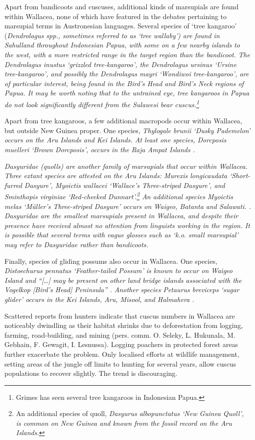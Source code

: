 Apart from bandicoots and cuscuses, additional kinds of marsupials
are found within Wallacea,
none of which have featured in the debates pertaining to marsupial
terms in Austronesian languages.
Several species of ‘tree kangaroo’ (\it{Dendrolagus spp}.,
sometimes referred to as ‘tree wallaby’) are found in Sahulland
throughout Indonesian Papua, with some on a few nearby islands to the west,
with a more restricted range in the target region than the bandicoot.
The \it{Dendrolagus inustus} ‘grizzled tree-kangaroo’,
the \it{Dendrolagus ursinus} ‘Ursine tree-kangaroo’,
and possibly the \it{Dendrolagus mayri} ‘Wondiwoi tree-kangaroo’,
are of particular interest,
being found in the Bird’s Head
and Bird’s Neck regions of Papua.
It may be worth noting that to the untrained eye,
tree kangaroos in Papua do not look significantly different from
the Sulawesi bear cuscus.\footnote{
		Grimes has seen several tree
		kangaroos in Indonesian Papua.}

Apart from tree kangaroos,
a few additional macropods occur within Wallacea, but outside New Guinea proper.
One species, \it{Thylogale brunii} ‘Dusky Pademelon’ occurs on
the Aru Islands and Kei Islands.
At least one species,
\it{Dorcposis muelleri} ‘Brown Dorcposis’,
occurs in the Raja Ampat Islands
\citep[60f, 64f]{LaveryFlannery2023}.

\it{Dasyuridae} (quolls) are another family of marsupials that occur within Wallacea.
Three extant species are attested on the Aru Islands: \it{Murexis
longicaudata} ‘Short-furred Dasyure’, \it{Myoictis wallacei} ‘Wallace’s Three-striped Dasyure’,
and \it{Sminthopis virginiae} ‘Red-cheeked Dunnart’.\footnote{
		An
		additional species of quoll,
		\it{Dasyurus albopunctatus} ‘New Guinea Quoll’,
		is common on New Guinea
		and known from the fossil record on the Aru Islands.}
An additional
species \it{Myoictis melas} ‘Müller’s Three-striped Dasyure’
occurs on Waigeo, Batanta and Salawati. \citep[42--48]{LaveryFlannery2023}.
\it{Dasyuridae} are the smallest marsupials present in Wallacea,
and despite their presence have received almost no attention
from linguists working in the region.
It is possible that several terms with vague glosses such as ‘k.o.
small marsupial’ may refer to \it{Dasyuridae} rather than bandicoots.

Finally, species of gliding possums also occur in Wallacea.
One species, \it{Distoechurus pennatus} ‘Feather-tailed Possum’
is known to occur on Waigeo Island
and “[{\ldots}] may be present on other land bridge islands associated
with the Vogelkop [Bird’s Head] Peninsula” \citep[56]{LaveryFlannery2023}.
Another species \it{Petaurus breviceps} ‘sugar glider’ occurs
in the Kei Islands,
Aru, Misool, and Halmahera \citep{Salas2016}.

Scattered reports from hunters indicate that cuscus numbers in
Wallacea are noticeably dwindling as their habitat shrinks due
to deforestation from logging,
farming, road-building, and mining (pers. comm. O. Seleky, L.
Hukunala, M. Gebhain, F. Gewagit, I. Lesnussa).
Logging poachers in protected forest areas further exacerbate the problem.
Only localised efforts at wildlife management,
setting areas of the jungle off limits to hunting for several
years, allow cuscus populations to recover slightly.
The trend is discouraging.